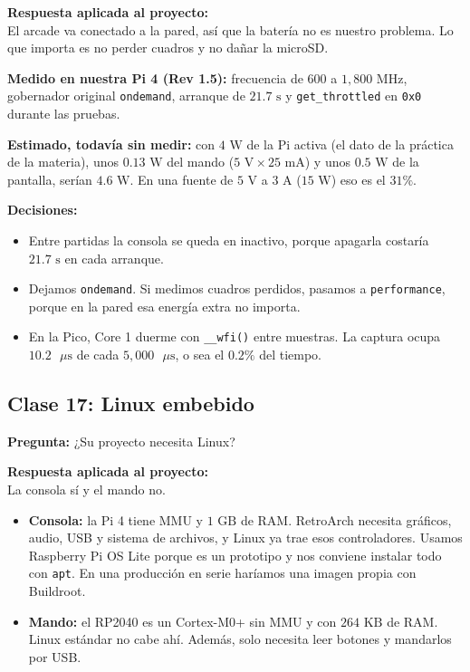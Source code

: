 \textbf{Respuesta aplicada al proyecto:} \\
El arcade va conectado a la pared, así que la batería no es nuestro problema. Lo que importa es no perder cuadros y no dañar la microSD.

\textbf{Medido en nuestra Pi 4 (Rev 1.5):} frecuencia de $600$ a $1{,}800\text{ MHz}$, gobernador original \texttt{ondemand}, arranque de $21.7\text{ s}$ y \texttt{get\_throttled} en \texttt{0x0} durante las pruebas.

\textbf{Estimado, todavía sin medir:} con $4\text{ W}$ de la Pi activa (el dato de la práctica de la materia), unos $0.13\text{ W}$ del mando ($5\text{ V} \times 25\text{ mA}$) y unos $0.5\text{ W}$ de la pantalla, serían $4.6\text{ W}$. En una fuente de $5\text{ V}$ a $3\text{ A}$ ($15\text{ W}$) eso es el $31\%$.

\textbf{Decisiones:}
\begin{itemize}
	\item Entre partidas la consola se queda en inactivo, porque apagarla costaría $21.7\text{ s}$ en cada arranque.
	\item Dejamos \texttt{ondemand}. Si medimos cuadros perdidos, pasamos a \texttt{performance}, porque en la pared esa energía extra no importa.
	\item En la Pico, Core 1 duerme con \texttt{\_\_wfi()} entre muestras. La captura ocupa $10.2\text{ }\mu\text{s}$ de cada $5{,}000\text{ }\mu\text{s}$, o sea el $0.2\%$ del tiempo.
\end{itemize}

\subsection{Clase 17: Linux embebido}

\textbf{Pregunta:} ¿Su proyecto necesita Linux?

\textbf{Respuesta aplicada al proyecto:} \\
La consola sí y el mando no.

\begin{itemize}
	\item \textbf{Consola:} la Pi 4 tiene MMU y $1\text{ GB}$ de RAM. RetroArch necesita gráficos, audio, USB y sistema de archivos, y Linux ya trae esos controladores. Usamos Raspberry Pi OS Lite porque es un prototipo y nos conviene instalar todo con \texttt{apt}. En una producción en serie haríamos una imagen propia con Buildroot.
	\item \textbf{Mando:} el RP2040 es un Cortex-M0+ sin MMU y con $264\text{ KB}$ de RAM. Linux estándar no cabe ahí. Además, solo necesita leer botones y mandarlos por USB.
\end{itemize}

